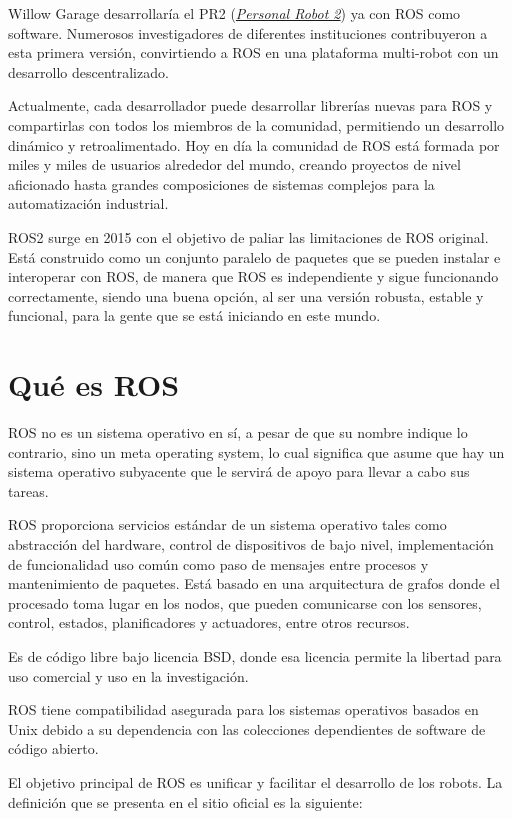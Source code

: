 Willow Garage desarrollaría el PR2 (\href{https://www.xatakaciencia.com/robotica/pr2-el-robot-de-codigo-abierto}{\textit{Personal Robot 2}}) ya con ROS como software. Numerosos investigadores de diferentes instituciones contribuyeron a esta primera versión, convirtiendo a ROS en una plataforma multi-robot con un desarrollo descentralizado.

Actualmente, cada desarrollador puede desarrollar librerías nuevas para ROS y compartirlas con todos los miembros de la comunidad, permitiendo un desarrollo dinámico y retroalimentado. Hoy en día la comunidad de ROS está formada por miles y miles de usuarios alrededor del mundo, creando proyectos de nivel aficionado hasta grandes composiciones de sistemas complejos para la automatización industrial.

ROS2 surge en 2015 con el objetivo de paliar las limitaciones de ROS original. Está construido como un conjunto paralelo de paquetes que se pueden instalar e interoperar con ROS, de manera que ROS es independiente y sigue funcionando correctamente, siendo una buena opción, al ser una versión robusta, estable y funcional, para la gente que se está iniciando en este mundo.

\section{Qué es ROS}
ROS no es un sistema operativo en sí, a pesar de que su nombre indique lo contrario, sino un meta operating system, lo cual significa que asume que hay un sistema operativo subyacente que le servirá de apoyo para llevar a cabo sus tareas.

ROS proporciona servicios estándar de un sistema operativo tales como abstracción del hardware, control de dispositivos de bajo nivel, implementación de funcionalidad uso común como paso de mensajes entre procesos y mantenimiento de paquetes. Está basado en una arquitectura de grafos donde el procesado toma lugar en los nodos, que pueden comunicarse con los sensores, control, estados, planificadores y actuadores, entre otros recursos.


Es de código libre bajo licencia BSD, donde esa licencia permite la libertad para uso comercial y uso en la investigación.

ROS tiene compatibilidad asegurada para los sistemas operativos basados en Unix debido a su dependencia con las colecciones dependientes de software de código abierto.


El objetivo principal de ROS es unificar y facilitar el desarrollo de los robots. La definición que se presenta en el sitio oficial es la siguiente:


